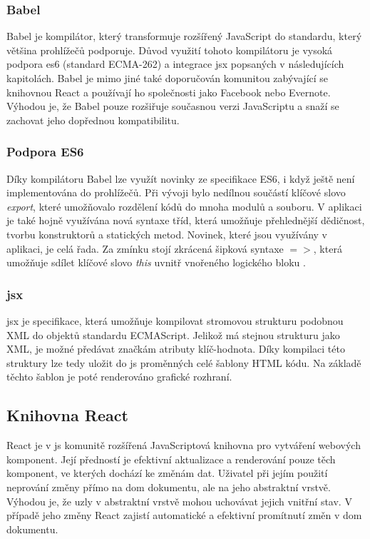 \documentclass[a4paper,11pt,titlepage,fleqn]{article}
\begin{document}
        \subsubsection{Babel}
            Babel je kompilátor, který transformuje rozšířený JavaScript do standardu, který většina prohlížečů podporuje. Důvod využití tohoto kompilátoru je vysoká podpora \gls{es6} (standard ECMA-262) a integrace \gls{jsx} popsaných v následujících kapitolách. Babel je mimo jiné také doporučován komunitou zabývající se knihovnou React a používají ho společnosti jako Facebook nebo Evernote. Výhodou je, že Babel pouze rozšiřuje současnou verzi JavaScriptu a snaží se zachovat jeho dopřednou kompatibilitu\cite{bib:babel}.

        \subsubsection{Podpora ES6}
            Díky kompilátoru Babel lze využít novinky ze specifikace ES6, i když ještě není implementována do prohlížečů. Při vývoji bylo nedílnou součástí klíčové slovo \textit{export}, které umožňovalo rozdělení kódů do mnoha modulů a souboru. V aplikaci je také hojně využívána nová syntaxe tříd, která umožňuje přehlednější dědičnost, tvorbu konstruktorů a statických metod. Novinek, které jsou využívány v aplikaci, je celá řada. Za zmínku stojí zkrácená šipková syntaxe $=>$, která umožňuje sdílet klíčové slovo \textit{this} uvnitř vnořeného logického bloku \cite{bib:ecma}. 

        \subsubsection{\gls{jsx}}
            \gls{jsx} je specifikace, která umožňuje kompilovat stromovou strukturu podobnou XML do objektů standardu ECMAScript\cite{bib:jsx}. Jelikož má stejnou strukturu jako XML, je možné předávat značkám atributy klíč-hodnota. Díky kompilaci této struktury lze tedy uložit do \gls{js} proměnných celé šablony HTML kódu. Na základě těchto šablon je poté renderováno grafické rozhraní.

    \subsection{Knihovna React}
        \label{react}
        React je v \gls{js} komunitě rozšířená JavaScriptová knihovna pro vytváření webových komponent. Její předností je efektivní aktualizace a renderování pouze těch komponent, ve kterých dochází ke změnám dat. Uživatel při jejím použití neprování změny přímo na \gls{dom} dokumentu, ale na jeho abstraktní vrstvě. Výhodou je, že uzly v abstraktní vrstvě mohou uchovávat jejich vnitřní stav. V případě jeho změny React zajistí automatické a efektivní promítnutí změn v \gls{dom} dokumentu. 
        
\end{document}
